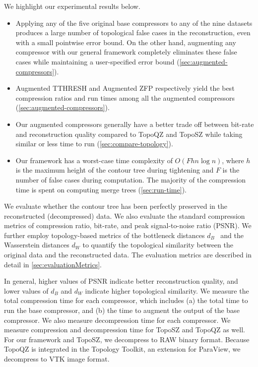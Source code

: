 We highlight our experimental results below. 
\begin{itemize}[noitemsep,leftmargin=*]
\item Applying any of the five original base compressors to any of the nine datasets produces a large number of topological false cases in the reconstruction, even with a small pointwise error bound. On the other hand, augmenting any compressor with our general framework completely eliminates these false cases while maintaining a user-specified error bound (\cref{sec:augmented-compressors}).
\item Augmented TTHRESH and Augmented ZFP respectively yield the best compression ratios and run times among all the augmented compressors (\cref{sec:augmented-compressors}).
\item Our augmented compressors generally have a better trade off between bit-rate and reconstruction quality compared to TopoQZ and TopoSZ while taking similar or less time to run (\cref{sec:compare-topology}).
\item Our framework has a worst-case time complexity of $O(F h n \log n)$, where $h$ is the maximum height of the contour tree during tightening and $F$ is the number of false cases during computation. The majority of the compression time is spent on computing merge trees (\cref{sec:run-time}).
\end{itemize}

We evaluate whether the contour tree has been perfectly preserved in the reconstructed (decompressed) data. 
We also evaluate the standard compression metrics of compression ratio, bit-rate, and peak signal-to-noise ratio (PSNR).
We further employ topology-based metrics of the bottleneck distances $d_B$~\cite{cohen2005stability} and the Wasserstein distances $d_W$ \cite[page 183]{edelsbrunner2022computational} to quantify the topological similarity between the original data and the reconstructed data. 
The evaluation metrics are described in detail in \cref{sec:evaluationMetrics}.

In general, higher values of PSNR indicate better reconstruction quality, and lower values of $d_B$ and $d_W$ indicate higher topological similarity. 
We measure the total compression time for each compressor, which includes (a) the total time to run the base compressor, and (b) the time to augment the output of the base compressor. We also measure decompression time for each compressor. We measure compression and decompression time for TopoSZ and TopoQZ as well. For our framework and TopoSZ, we decompress to RAW binary format. Because TopoQZ is integrated in the Topology Toolkit, an extension for ParaView, we decompress to VTK image format.

